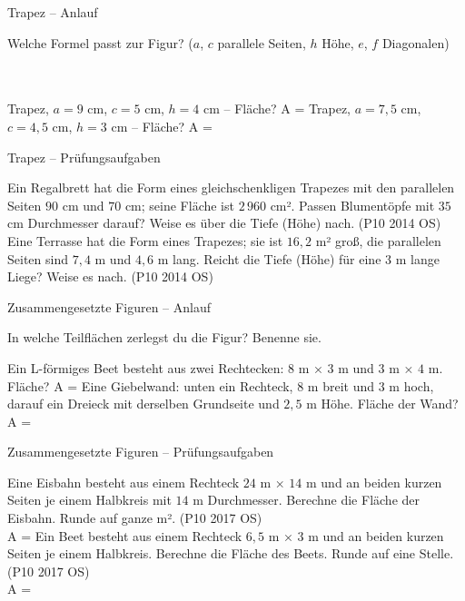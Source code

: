 \begin{aufgabe}{Trapez – Anlauf}
\begin{teile}
\teil Welche Formel passt zur Figur? ($a$, $c$ parallele Seiten, $h$ Höhe, $e$, $f$ Diagonalen) \\  \\  \\ 

\teil Trapez, $a = 9$ cm, $c = 5$ cm, $h = 4$ cm – Fläche? A = \leerfeld[cm²]
\teil Trapez, $a = 7{,}5$ cm, $c = 4{,}5$ cm, $h = 3$ cm – Fläche? A = \leerfeld[cm²]
\end{teile}
\end{aufgabe}

\begin{aufgabe}{Trapez – Prüfungsaufgaben}
\begin{teile}
\steil Ein Regalbrett hat die Form eines gleichschenkligen Trapezes mit den parallelen Seiten $90$ cm und $70$ cm; seine Fläche ist $2\,960$ cm². Passen Blumentöpfe mit $35$ cm Durchmesser darauf? Weise es über die Tiefe (Höhe) nach. \hfill (P10 2014 OS)
\steil Eine Terrasse hat die Form eines Trapezes; sie ist $16{,}2$ m² groß, die parallelen Seiten sind $7{,}4$ m und $4{,}6$ m lang. Reicht die Tiefe (Höhe) für eine $3$ m lange Liege? Weise es nach. \hfill (P10 2014 OS)
\end{teile}
\end{aufgabe}

\begin{aufgabe}{Zusammengesetzte Figuren – Anlauf}
\begin{teile}
\teil In welche Teilflächen zerlegst du die Figur? Benenne sie.

\teil Ein L-förmiges Beet besteht aus zwei Rechtecken: $8$ m × $3$ m und $3$ m × $4$ m. Fläche? A = \leerfeld[m²]
\teil Eine Giebelwand: unten ein Rechteck, $8$ m breit und $3$ m hoch, darauf ein Dreieck mit derselben Grundseite und $2{,}5$ m Höhe. Fläche der Wand? A = \leerfeld[m²]
\end{teile}
\end{aufgabe}

\begin{aufgabe}{Zusammengesetzte Figuren – Prüfungsaufgaben}
\begin{teile}
\teil Eine Eisbahn besteht aus einem Rechteck $24$ m × $14$ m und an beiden kurzen Seiten je einem Halbkreis mit $14$ m Durchmesser. Berechne die Fläche der Eisbahn. Runde auf ganze m². \hfill (P10 2017 OS) \\ A = \leerfeld[m²]
\teil Ein Beet besteht aus einem Rechteck $6{,}5$ m × $3$ m und an beiden kurzen Seiten je einem Halbkreis. Berechne die Fläche des Beets. Runde auf eine Stelle. \hfill (P10 2017 OS) \\ A = \leerfeld[m²]
\end{teile}
\end{aufgabe}
